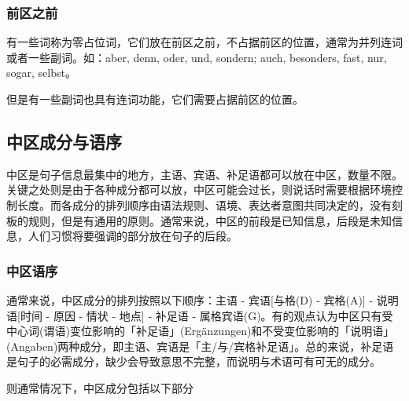 \subsubsection{前区之前}
有一些词称为零占位词，它们放在前区之前，不占据前区的位置，通常为并列连词或者一些副词。如：aber, denn, oder, und, sondern; auch, besonders, fast, nur, sogar, selbst。


但是有一些副词也具有连词功能，它们需要占据前区的位置。


\subsection{中区成分与语序}
中区是句子信息最集中的地方，主语、宾语、补足语都可以放在中区，数量不限。关键之处则是由于各种成分都可以放，中区可能会过长，则说话时需要根据环境控制长度。而各成分的排列顺序由语法规则、语境、表达者意图共同决定的，没有刻板的规则，但是有通用的原则。通常来说，中区的前段是已知信息，后段是未知信息，人们习惯将要强调的部分放在句子的后段。

\subsubsection{中区语序}
通常来说，中区成分的排列按照以下顺序：主语 - 宾语[与格(D) - 宾格(A)] - 说明语[时间 - 原因 - 情状 - 地点] - 补足语 - 属格宾语(G)。有的观点认为中区只有受中心词(谓语)变位影响的「补足语」(Ergänzungen)和不受变位影响的「说明语」(Angaben)两种成分，即主语、宾语是「主/与/宾格补足语」。总的来说，补足语是句子的必需成分，缺少会导致意思不完整，而说明与术语可有可无的成分。

则通常情况下，中区成分包括以下部分

